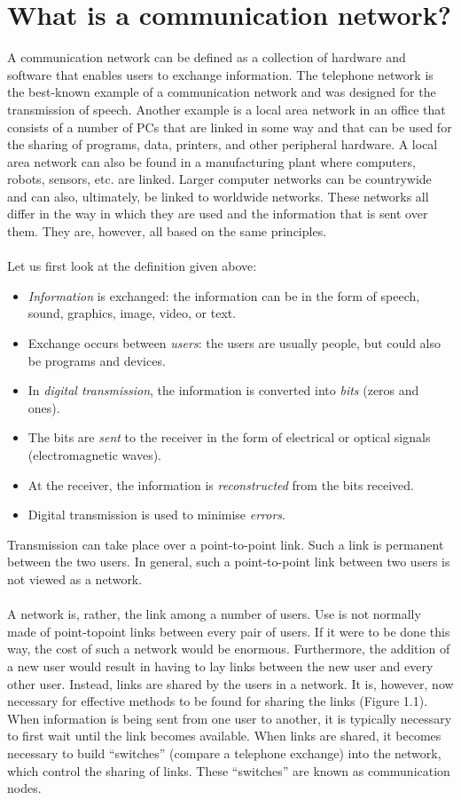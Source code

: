 \documentclass[a4paper, 12pt, titlepage]{report}
\begin{document}
\section{What is a communication network?}
A communication network can be defined as a collection of hardware and software that enables users to exchange information. The telephone network is the best-known example of a communication network and was designed for the transmission of speech. Another example is a local area network in an office that consists of a number of PCs that are linked in some way and that can be used for the sharing of programs, data, printers, and other peripheral hardware. A local area network can also be found in a manufacturing plant where computers, robots, sensors, etc. are linked. Larger computer networks can be countrywide and can also, ultimately, be linked to worldwide networks. These networks all differ in the way in which they are used and the information that is sent over them. They are, however, all based on the same principles.\\\\
Let us first look at the definition given above:
\begin{itemize}
\item \emph{Information} is exchanged: the information can be in the form of speech, sound, graphics, image, video, or text.
\item Exchange occurs between \emph{users}: the users are usually people, but could also be programs and devices.
\item In \emph{digital transmission}, the information is converted into \emph{bits} (zeros and ones).
\item The bits are \emph{sent} to the receiver in the form of electrical or optical signals (electromagnetic waves).
\item At the receiver, the information is \emph{reconstructed} from the bits received.
\item Digital transmission is used to minimise \emph{errors}.
\end{itemize}
Transmission can take place over a point-to-point link. Such a link is permanent between the two users. In general, such a point-to-point link between two users is not viewed as a network.\\\\
A network is, rather, the link among a number of users. Use is not normally made of point-topoint links between every pair of users. If it were to be done this way, the cost of such a network would be enormous. Furthermore, the addition of a new user would result in having to lay links between the new user and every other user. Instead, links are shared by the users in a network. It is, however, now necessary for effective methods to be found for sharing the links (Figure 1.1). When information is being sent from one user to another, it is typically necessary to first wait until the link becomes available. When links are shared, it becomes necessary to build “switches” (compare a telephone exchange) into the network, which control the sharing of links. These “switches” are known as communication nodes.\\\\
\end{document}
